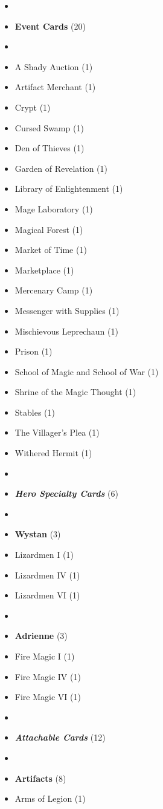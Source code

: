 \begin{multicols*}{3}
\begin{itemize}[leftmargin=0pt, label={}, noitemsep]
  \item
  \item \textbf{Event Cards} (20)
  \item
  \item A Shady Auction (1)
  \item Artifact Merchant (1)
  \item Crypt (1)
  \item Cursed Swamp (1)
  \item Den of Thieves (1)
  \item Garden of Revelation (1)
  \item Library of Enlightenment (1)
  \item Mage Laboratory (1)
  \item Magical Forest (1)
  \item Market of Time (1)
  \item Marketplace (1)
  \item Mercenary Camp (1)
  \item Messenger with Supplies (1)
  \item Mischievous Leprechaun (1)
  \item Prison (1)
  \item School of Magic and School of War (1)
  \item Shrine of the Magic Thought (1)
  \item Stables (1)
  \item The Villager's Plea (1)
  \item Withered Hermit (1)
  \item
  \item \textbf{\emph{Hero Specialty Cards}} (6)
  \item
  \item \textbf{Wystan} (3)
  \item Lizardmen I (1)
  \item Lizardmen IV (1)
  \item Lizardmen VI (1)
  \item
  \item \textbf{Adrienne} (3)
  \item Fire Magic I (1)
  \item Fire Magic IV (1)
  \item Fire Magic VI (1)
  \item
  \item \textbf{\emph{Attachable Cards}} (12)
  \item 
  \item \textbf{Artifacts} (8)
  \item Arms of Legion (1)

\end{itemize}
\end{multicols*}
